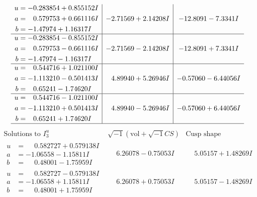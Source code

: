 \documentclass[1p]{elsarticle_modified}
\theoremstyle{definition}
\newcommand{\I}{\sqrt{-1}}
\begin{document}
$$\begin{array}{c|c|c}
\begin{aligned}
u &= -0.283854 + 0.855152 I \\
a &= \phantom{-}0.579753 + 0.661116 I \\
b &= -1.47974 + 1.16317 I\end{aligned}
 & -2.71569 + 2.14208 I & -12.8091 - 7.3341 I \\ \hline\begin{aligned}
u &= -0.283854 - 0.855152 I \\
a &= \phantom{-}0.579753 - 0.661116 I \\
b &= -1.47974 - 1.16317 I\end{aligned}
 & -2.71569 - 2.14208 I & -12.8091 + 7.3341 I \\ \hline\begin{aligned}
u &= \phantom{-}0.544716 + 1.021100 I \\
a &= -1.113210 - 0.501413 I \\
b &= \phantom{-}0.65241 - 1.74620 I\end{aligned}
 & \phantom{-}4.89940 + 5.26946 I & -0.57060 - 6.44056 I \\ \hline\begin{aligned}
u &= \phantom{-}0.544716 - 1.021100 I \\
a &= -1.113210 + 0.501413 I \\
b &= \phantom{-}0.65241 + 1.74620 I\end{aligned}
 & \phantom{-}4.89940 - 5.26946 I & -0.57060 + 6.44056 I\\
 \hline 
 \end{array}$$\newpage$$\begin{array}{c|c|c}  
\text{Solutions to }I^u_{3}& \I (\text{vol} + \sqrt{-1}CS) & \text{Cusp shape}\\
 \hline 
\begin{aligned}
u &= \phantom{-}0.582727 + 0.579138 I \\
a &= -1.06558 - 1.15811 I \\
b &= \phantom{-}0.48001 - 1.75959 I\end{aligned}
 & \phantom{-}6.26078 - 0.75053 I & \phantom{-}5.05157 + 1.48269 I \\ \hline\begin{aligned}
u &= \phantom{-}0.582727 - 0.579138 I \\
a &= -1.06558 + 1.15811 I \\
b &= \phantom{-}0.48001 + 1.75959 I\end{aligned}
 & \phantom{-}6.26078 + 0.75053 I & \phantom{-}5.05157 - 1.48269 I \\ \hline\begin{aligned}

\end{aligned}
\end{array}$$
\end{document}
